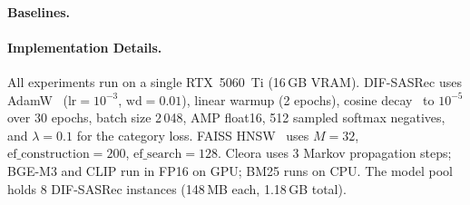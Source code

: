 \paragraph{Baselines.}


\paragraph{Implementation Details.}
All experiments run on a single RTX~5060~Ti (16\,GB VRAM).
DIF-SASRec uses AdamW~\cite{loshchilov2019decoupled} ($\text{lr}=10^{-3}$, $\text{wd}=0.01$),
linear warmup (2 epochs), cosine decay~\cite{loshchilov2017sgdr} to $10^{-5}$ over 30 epochs,
batch size 2\,048, AMP float16, 512 sampled softmax negatives, and $\lambda=0.1$
for the category loss.
FAISS HNSW~\cite{malkov2018efficient} uses $M{=}32$, $\text{ef\_construction}{=}200$,
$\text{ef\_search}{=}128$.
Cleora uses 3 Markov propagation steps; BGE-M3 and CLIP run in FP16 on GPU;
BM25 runs on CPU.
The model pool holds 8 DIF-SASRec instances (148\,MB each, 1.18\,GB total).
